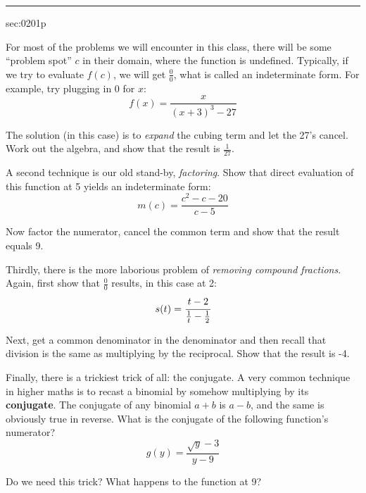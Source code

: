 \renewcommand{\columnseprule}{1.5pt}
\begin{multicols*}{2}
\rule[0.5\baselineskip]{0.4\textwidth}{1pt}
\noindent
{}\label{sec:0201p}
\begin{exercises}{sec:0201p}

\lab{} For most of the problems we will encounter in this class, there will be some 
``problem spot'' $c$ in their domain, where the function is undefined.  Typically, if 
we try to evaluate $f(c)$, we will get $\frac{0}{0}$, what is called an 
\gls{indeterminate form}.  For example, try plugging in 0 for $x$:
$$
f(x)=\frac{x}{(x+3)^3-27}
$$

\vspace{1cm}
\lab{} The solution (in this case) is to \emph{expand} the cubing term and let the 27's cancel.  
Work out the algebra, and show that the result
is $\frac{1}{27}$.

\vspace{2cm}
\lab{} A second technique is our old stand-by, \emph{factoring}.  Show that direct 
evaluation of this function at 5 yields an indeterminate form:
$$
m(c) = \frac{c^2-c-20}{c-5}
$$

\vspace{1cm}
\lab{}  Now factor the numerator, cancel the common term and show that the result equals 9.

\vspace{2cm}
\lab{} Thirdly, there is the more laborious problem of \emph{removing compound fractions}.  
Again, first show that $\frac{0}{0}$ results, in this case at 2:
$$
s(t)=\cfrac{t-2}{\frac{1}{t}-\frac{1}{2}}
$$

\vspace{1cm}
\lab{}  Next, get a common denominator in the denominator and then recall that division is the 
same as multiplying by the reciprocal.  Show that the result is -4.

\vspace{2cm}
\lab{} Finally, there is a trickiest trick of all: the conjugate.  A very common technique in 
higher maths is to recast a binomial by somehow multiplying by its \textbf{conjugate}.  
 The conjugate of any binomial $a+b$ is $a-b$, and the same is obviously
true in reverse.  What is the conjugate of the following function's numerator?
$$
g(y) = \frac{\sqrt{y}-3}{y-9}
$$

\vspace{1cm}
\lab{}  Do we need this trick?  What happens to the function at 9?


\end{exercises}
\end{multicols*}
